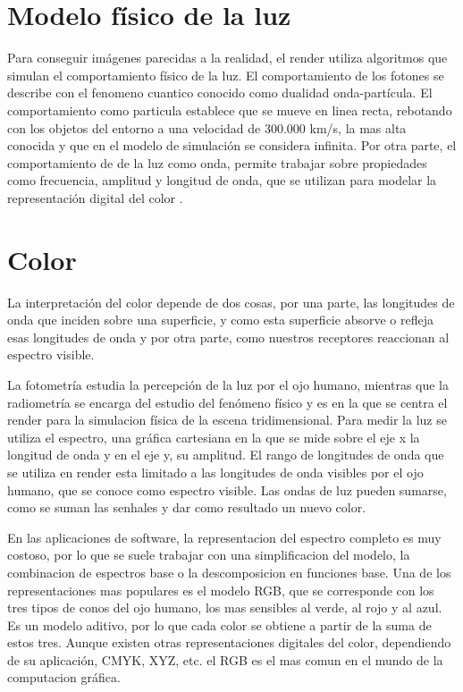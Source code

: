 \section{Modelo f\'isico de la luz}
    Para conseguir im\'agenes parecidas a la realidad, el render utiliza algoritmos que simulan el comportamiento f\'isico de la luz.
    El comportamiento de los fotones se describe con el fenomeno cuantico conocido como dualidad onda-part\'icula. El comportamiento
    como particula establece que se mueve en linea recta, rebotando con los objetos del entorno a una velocidad de 300.000 km/s,
    la mas alta conocida y que en el modelo de simulaci\'on se considera infinita. Por otra parte, el comportamiento de de la luz como
    onda, permite trabajar sobre propiedades como frecuencia, amplitud y longitud de onda, que se utilizan para modelar la representaci\'on
    digital del color .

\section{Color}
    La interpretaci\'on del color depende de dos cosas, por una parte, las longitudes de onda que inciden sobre una superficie, y como
    esta superficie absorve o refleja esas longitudes de onda y por otra parte, como nuestros receptores reaccionan al espectro visible.
    
    La fotometr\'ia estudia la percepci\'on de la luz por el ojo humano, mientras que la radiometr\'ia se encarga del estudio del fen\'omeno
    f\'isico y es en la que se centra el render para la simulacion f\'isica de la escena tridimensional.
    Para medir la luz se utiliza el espectro, una gr\'afica cartesiana en la que se mide sobre el eje x la longitud de onda y en el eje y,
    su amplitud. El rango de longitudes de onda que se utiliza en render esta limitado a las longitudes de onda visibles por el ojo humano,
    que se conoce como espectro visible. Las ondas de luz pueden sumarse, como se suman las senhales y dar como resultado un nuevo color.
    
    En las aplicaciones de software, la representacion del espectro completo es muy costoso, por lo que se suele trabajar con una
    simplificacion del modelo, la combinacion de espectros base o la descomposicion en funciones base.
    Una de los representaciones mas populares es el modelo RGB, que se corresponde con los tres tipos de conos del ojo humano, los mas
    sensibles al verde, al rojo y al azul.  Es un modelo aditivo, por lo que cada color se obtiene a partir de la suma de estos tres. Aunque
    existen otras representaciones digitales del color, dependiendo de su aplicaci\'on, CMYK, XYZ, etc. el RGB es el mas comun en el mundo de
    la computacion gr\'afica.

